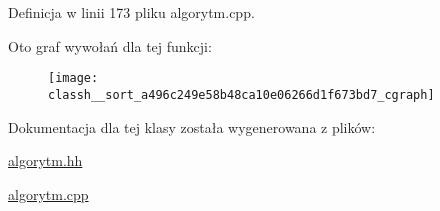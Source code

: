 \-Definicja w linii 173 pliku algorytm.\-cpp.



\-Oto graf wywołań dla tej funkcji\-:
\nopagebreak
\begin{figure}[H]
\begin{center}
\leavevmode
\texttt{[image: classh\_\_sort\_a496c249e58b48ca10e06266d1f673bd7\_cgraph]}
\end{center}
\end{figure}




\-Dokumentacja dla tej klasy została wygenerowana z plików\-:\begin{DoxyCompactItemize}
\item 
\hyperlink{algorytm_8hh}{algorytm.\-hh}\item 
\hyperlink{algorytm_8cpp}{algorytm.\-cpp}\end{DoxyCompactItemize}
